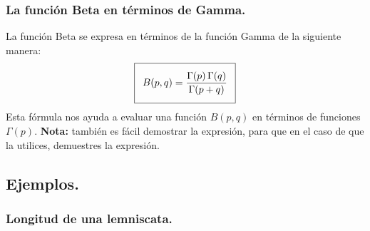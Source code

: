 \subsubsection{La función Beta en términos de Gamma.}

La función Beta se expresa en términos de la función Gamma de la siguiente manera:
\begin{align}
\addtolength{\fboxsep}{5pt}\boxed{B(p, q) = \dfrac{\Gamma(p) \, \Gamma(q)}{\Gamma (p + q)}}
\label{eq:ecuacion_07_01}
\end{align}
Esta fórmula nos ayuda a evaluar una función $B (p, q)$ en términos de funciones $\Gamma (p)$. \textbf{Nota: } también es fácil demostrar la expresión, para que en el caso de que la utilices, demuestres la expresión.

\subsection{Ejemplos.}

\subsubsection{Longitud de una lemniscata.}

